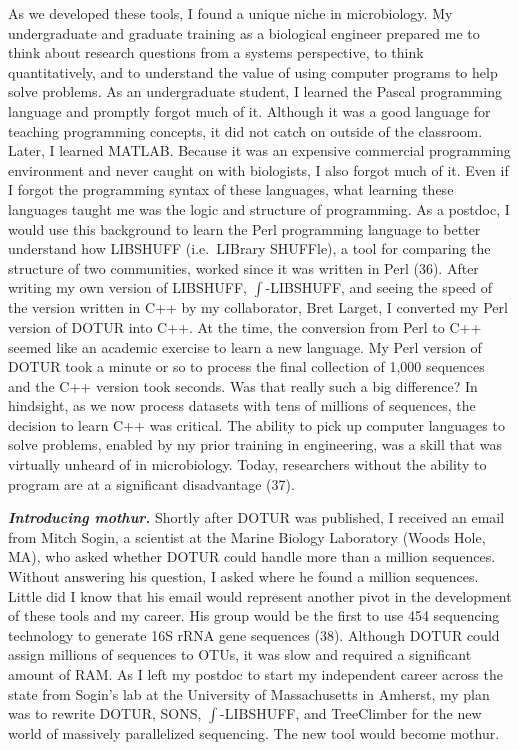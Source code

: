 \documentclass[11pt,]{article}
\begin{document}
As we developed these tools, I found a unique niche in microbiology. My
undergraduate and graduate training as a biological engineer prepared me
to think about research questions from a systems perspective, to think
quantitatively, and to understand the value of using computer programs
to help solve problems. As an undergraduate student, I learned the
Pascal programming language and promptly forgot much of it. Although it
was a good language for teaching programming concepts, it did not catch
on outside of the classroom. Later, I learned MATLAB. Because it was an
expensive commercial programming environment and never caught on with
biologists, I also forgot much of it. Even if I forgot the programming
syntax of these languages, what learning these languages taught me was
the logic and structure of programming. As a postdoc, I would use this
background to learn the Perl programming language to better understand
how LIBSHUFF (i.e.~LIBrary SHUFFle), a tool for comparing the structure
of two communities, worked since it was written in Perl (36). After
writing my own version of LIBSHUFF, \(\int\)-LIBSHUFF, and seeing the
speed of the version written in C++ by my collaborator, Bret Larget, I
converted my Perl version of DOTUR into C++. At the time, the conversion
from Perl to C++ seemed like an academic exercise to learn a new
language. My Perl version of DOTUR took a minute or so to process the
final collection of 1,000 sequences and the C++ version took seconds.
Was that really such a big difference? In hindsight, as we now process
datasets with tens of millions of sequences, the decision to learn C++
was critical. The ability to pick up computer languages to solve
problems, enabled by my prior training in engineering, was a skill that
was virtually unheard of in microbiology. Today, researchers without the
ability to program are at a significant disadvantage (37).

\textbf{\emph{Introducing mothur.}} Shortly after DOTUR was published, I
received an email from Mitch Sogin, a scientist at the Marine Biology
Laboratory (Woods Hole, MA), who asked whether DOTUR could handle more
than a million sequences. Without answering his question, I asked where
he found a million sequences. Little did I know that his email would
represent another pivot in the development of these tools and my career.
His group would be the first to use 454 sequencing technology to
generate 16S rRNA gene sequences (38). Although DOTUR could assign
millions of sequences to OTUs, it was slow and required a significant
amount of RAM. As I left my postdoc to start my independent career
across the state from Sogin's lab at the University of Massachusetts in
Amherst, my plan was to rewrite DOTUR, SONS, \(\int\)-LIBSHUFF, and
TreeClimber for the new world of massively parallelized sequencing. The
new tool would become mothur.
\end{document}
